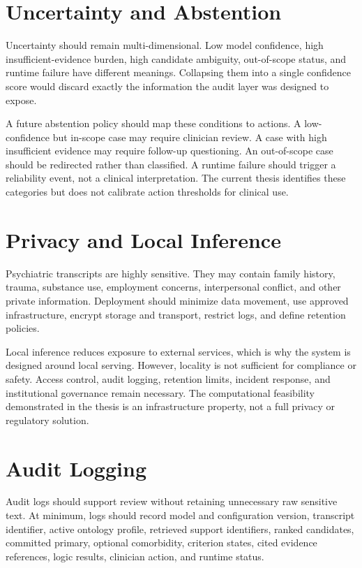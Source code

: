 \section{Uncertainty and Abstention}

Uncertainty should remain multi-dimensional. Low model confidence, high insufficient-evidence burden, high candidate ambiguity, out-of-scope status, and runtime failure have different meanings. Collapsing them into a single confidence score would discard exactly the information the audit layer was designed to expose.

A future abstention policy should map these conditions to actions. A low-confidence but in-scope case may require clinician review. A case with high insufficient evidence may require follow-up questioning. An out-of-scope case should be redirected rather than classified. A runtime failure should trigger a reliability event, not a clinical interpretation. The current thesis identifies these categories but does not calibrate action thresholds for clinical use.

\section{Privacy and Local Inference}

Psychiatric transcripts are highly sensitive. They may contain family history, trauma, substance use, employment concerns, interpersonal conflict, and other private information. Deployment should minimize data movement, use approved infrastructure, encrypt storage and transport, restrict logs, and define retention policies.

Local inference reduces exposure to external services, which is why the system is designed around local serving. However, locality is not sufficient for compliance or safety. Access control, audit logging, retention limits, incident response, and institutional governance remain necessary. The computational feasibility demonstrated in the thesis is an infrastructure property, not a full privacy or regulatory solution.

\section{Audit Logging}

Audit logs should support review without retaining unnecessary raw sensitive text. At minimum, logs should record model and configuration version, transcript identifier, active ontology profile, retrieved support identifiers, ranked candidates, committed primary, optional comorbidity, criterion states, cited evidence references, logic results, clinician action, and runtime status.

